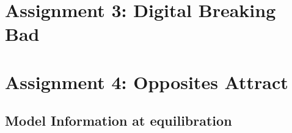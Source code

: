 \documentclass[10pt,a4paper]{labreport}
\begin{document}
\newpage
\section{Assignment 3: Digital Breaking Bad}

\newpage
\section{Assignment 4: Opposites Attract}
\subsection{Model Information at equilibration}

\subsection{}

%   
\end{document}
